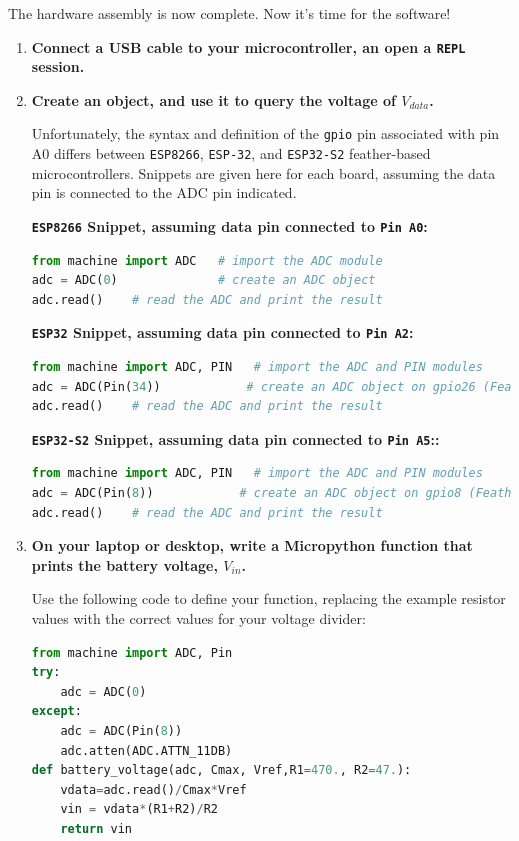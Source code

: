	The hardware assembly is now complete.
	Now it's time for the software!

\begin{enumerate}[resume]
	\item \textbf{Connect a USB cable to your microcontroller, an open a \texttt{REPL} session.}

	\item \textbf{Create an \adc object, and use it to query the voltage of $V_{data}$.}

	Unfortunately, the syntax and definition of the \texttt{gpio} pin associated with pin A0 differs between \texttt{ESP8266}, \texttt{ESP-32}, and \texttt{ESP32-S2} feather-based microcontrollers.   Snippets are given here for each board, assuming the data pin is connected to the ADC pin indicated.

\textbf{\texttt{ESP8266} Snippet, assuming data pin connected to \texttt{Pin A0}:}
\begin{lstlisting}[language=Python]
from machine import ADC   # import the ADC module
adc = ADC(0)              # create an ADC object
adc.read()    # read the ADC and print the result
\end{lstlisting}

\textbf{\texttt{ESP32} Snippet, assuming data pin connected to \texttt{Pin A2}:}
\begin{lstlisting}[language=Python]
from machine import ADC, PIN   # import the ADC and PIN modules
adc = ADC(Pin(34))            # create an ADC object on gpio26 (Feather pin A0)
adc.read()    # read the ADC and print the result
\end{lstlisting}

\textbf{\texttt{ESP32-S2}  Snippet, assuming data pin connected to \texttt{Pin A5}::}
\begin{lstlisting}[language=Python]
from machine import ADC, PIN   # import the ADC and PIN modules
adc = ADC(Pin(8))            # create an ADC object on gpio8 (Feather pin A5)
adc.read()    # read the ADC and print the result
\end{lstlisting}


	\item \textbf{On your laptop or desktop, write a Micropython function that prints the battery voltage, $V_{in}$.}

	Use the following code to define your function, replacing the example resistor values with the correct values for your voltage divider:

\begin{lstlisting}[language=Python]
from machine import ADC, Pin
try:
    adc = ADC(0)
except:
    adc = ADC(Pin(8))
    adc.atten(ADC.ATTN_11DB)
def battery_voltage(adc, Cmax, Vref,R1=470., R2=47.):
    vdata=adc.read()/Cmax*Vref
    vin = vdata*(R1+R2)/R2
    return vin
\end{lstlisting}



\end{enumerate}
